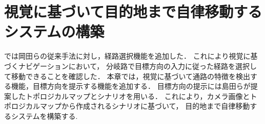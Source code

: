 \chapter{視覚に基づいて目的地まで自律移動するシステムの構築}
\label{chap:scenario_vision}
では岡田らの従来手法に対し，経路選択機能を追加した．
これにより視覚に基づくナビゲーションにおいて，
分岐路で目標方向の入力に従った経路を選択して移動できることを確認した．
本章では，視覚に基づいて通路の特徴を検出する機能，目標方向を提示する機能を追加する．
目標方向の提示には島田ら\cite{shimada2020}が提案したトポロジカルマップとシナリオを用いる．
これにより，カメラ画像とトポロジカルマップから作成されるシナリオに基づいて，
目的地まで自律移動するシステムを構築する.
%
%
%

\newpage

\newpage

\newpage

\newpage

